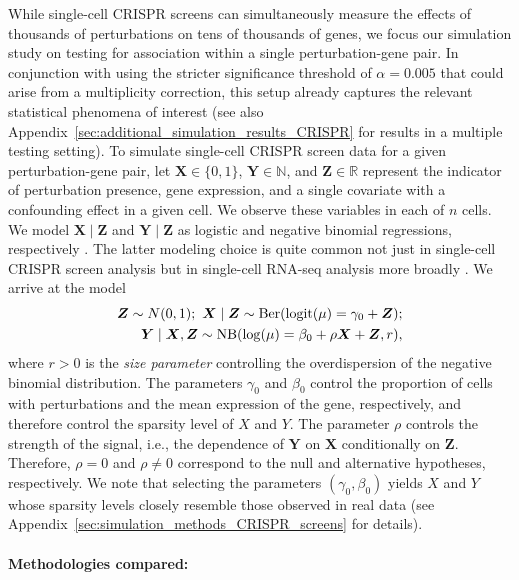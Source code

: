 \documentclass[12pt]{article}
\theoremstyle{definition}
\newcommand{\R}{\mathbb{R}}								%
\newcommand{\N}{\mathbb{N}}								%
\newcommand{\prx}{\bm X}								%
\newcommand{\srx}{X}									%
\newcommand{\prz}{\bm Z}								%
\newcommand{\pry}{{\bm Y}}								%
\newcommand{\sry}{Y}									%
\begin{document}
  While single-cell CRISPR screens can simultaneously measure the effects of thousands of perturbations on tens of thousands of genes, we focus our simulation study on testing for association within a single perturbation-gene pair. In conjunction with using the stricter significance threshold of $\alpha = 0.005$ that could arise from a multiplicity correction, this setup already captures the relevant statistical phenomena of interest (see also Appendix~\ref{sec:additional_simulation_results_CRISPR} for results in a multiple testing setting). To simulate single-cell CRISPR screen data for a given perturbation-gene pair, let $\prx \in \{0,1\}$, $\pry \in \N$, and $\prz \in \R$ represent the indicator of perturbation presence, gene expression, and a single covariate with a confounding effect in a given cell. We observe these variables in each of $n$ cells. We model $\prx\mid\prz$ and $\pry\mid\prz$ as logistic and negative binomial regressions, respectively \citep{Gasperini2019a,Katsevich2020c,Barry2024}. The latter modeling choice is quite common not just in single-cell CRISPR screen analysis but in single-cell RNA-seq analysis more broadly \citep{Huang2018, Svensson2020,Sarkar2020}. We arrive at the model
  \begin{align}\label{eq:simulation-model-CRISPR-screens}
	\bm Z\sim N(0,1); \	\bm X \mid \bm Z\sim \textnormal{Ber}(\text{logit}(\mu) = \gamma_0+\bm Z);\\
   \bm Y \mid \bm X,\bm Z\sim \textnormal{NB}(\log(\mu) = \beta_0+\rho\bm X+\bm Z,r),
  \end{align}
  where $r > 0$ is the \textit{size parameter} controlling the overdispersion of the negative binomial distribution. The parameters $\gamma_0$ and $\beta_0$ control the proportion of cells with perturbations and the mean expression of the gene, respectively, and therefore control the sparsity level of $\srx$ and $\sry$. The parameter $\rho$ controls the strength of the signal, i.e., the dependence of $\pry$ on $\prx$ conditionally on $\prz$. Therefore, $\rho = 0$ and $\rho \neq 0$ correspond to the null and alternative hypotheses, respectively. We note that selecting the parameters $(\gamma_0,\beta_0)$ yields $\srx$ and $\sry$ whose sparsity levels closely resemble those observed in real data (see Appendix~\ref{sec:simulation_methods_CRISPR_screens} for details).
  
  
  \paragraph{Methodologies compared:}
  
\end{document}
